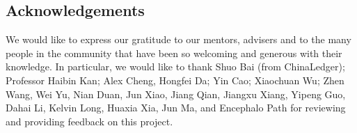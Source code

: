 \documentclass[UTF8,nofonts]{article}
\begin{document}
\begin{multicols}{2}
\section{Acknowledgements}
We would like to express our gratitude to our mentors, advisers and to the many people in the community that have been so welcoming and generous with their knowledge. In particular, we would like to thank Shuo Bai (from ChinaLedger); Professor Haibin Kan; Alex Cheng, Hongfei Da; Yin Cao; Xiaochuan Wu; Zhen Wang, Wei Yu, Nian Duan, Jun Xiao, Jiang Qian, Jiangxu Xiang, Yipeng Guo, Dahai Li, Kelvin Long, Huaxia Xia, Jun Ma, and Encephalo Path for reviewing and providing feedback on this project. 






\end{multicols}
\end{document}
